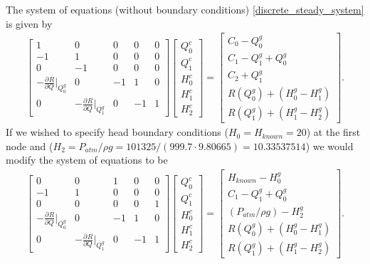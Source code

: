\documentclass[12pt]{article}
\newcommand{\pardiv}[3]{\frac{\partial^{#1} #2}{\partial #3^{#1}}}
\begin{document}
The system of equations (without boundary conditions) \eqref{discrete_steady_system} is given by
\begin{align*}
\begin{bmatrix}
1 & 0 & 0 & 0 & 0 \\
-1 & 1 & 0 & 0 & 0 \\
0 & -1 & 0 & 0 & 0 \\
-\pardiv{}{R}{Q}\big\vert_{Q_0^g} & 0 & -1 & 1 & 0 \\
0 & -\pardiv{}{R}{Q}\big\vert_{Q_1^g} & 0 & -1 & 1
\end{bmatrix} \begin{bmatrix}
Q_0^c \\ Q_1^c \\ H_0^c \\ H_1^c \\ H_2^c
\end{bmatrix} = \begin{bmatrix}
C_0 - Q_0^g \\ C_1 - Q_1^g + Q_0^g \\ C_2 + Q_1^g \\ R(Q_0^g) + \left(H_0^g - H_1^g \right) \\ R(Q_1^g) + \left(H_1^g - H_2^g \right)
\end{bmatrix}.
\end{align*}
If we wished to specify head boundary conditions ($H_0 = H_{known} = 20$) at the first node and ($H_2 = P_{atm} / \rho g = 101325 / (999.7 \cdot 9.80665) = 10.33537514$) we would modify the system of equations to be 
\begin{align*}
\begin{bmatrix}
0 & 0 & 1 & 0 & 0 \\
-1 & 1 & 0 & 0 & 0 \\
0 & 0 & 0 & 0 & 1 \\
-\pardiv{}{R}{Q}\big\vert_{Q_0^g} & 0 & -1 & 1 & 0 \\
0 & -\pardiv{}{R}{Q}\big\vert_{Q_1^g} & 0 & -1 & 1 
\end{bmatrix} \begin{bmatrix}
Q_0^c \\ Q_1^c \\ H_0^c \\ H_1^c \\ H_2^c
\end{bmatrix} = \begin{bmatrix}
H_{known} - H_0^g \\ C_1 - Q_1^g + Q_0^g \\ \left( P_{atm} / \rho g \right) - H_2^g \\ R(Q_0^g) +  \left(H_0^g - H_1^g \right) \\ R(Q_1^g) + \left(H_1^g - H_2^g \right)
\end{bmatrix}.
\end{align*}
\end{document}
